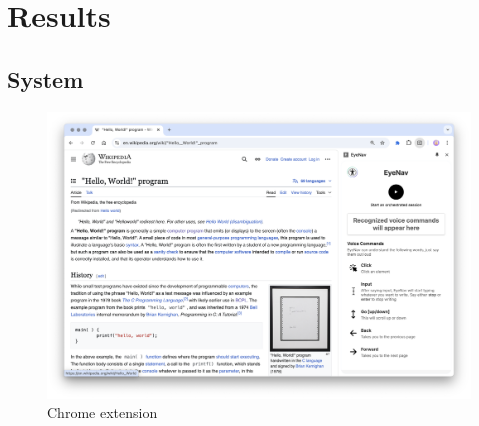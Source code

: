 \section{Results}

\subsection{System}

\begin{figure}[ht]
    \centering
    \includegraphics[width=1\textwidth]{images/screenshots/eyenav-1.png}
    \caption{Chrome extension}
    \label{fig:ss-1}
\end{figure}

